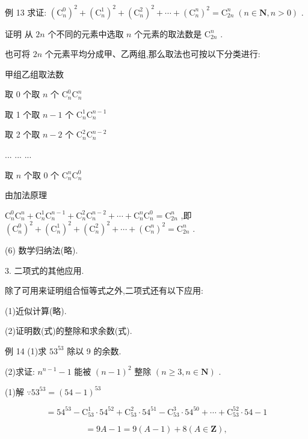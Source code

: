 \documentclass[10pt]{article}
\begin{document}
例 13 求证: \({\left( {\mathrm{C}}_{n}^{0}\right) }^{2} + {\left( {\mathrm{C}}_{n}^{1}\right) }^{2} + {\left( {\mathrm{C}}_{n}^{2}\right) }^{2} + \cdots  + {\left( {\mathrm{C}}_{n}^{n}\right) }^{2} = {\mathrm{C}}_{2n}^{n}\;\left( {n \in  \mathbf{N},n > 0}\right)\) .

证明 从 \({2n}\) 个不同的元素中选取 \(n\) 个元素的取法数是 \({\mathrm{C}}_{2n}^{n}\) .

也可将 \({2n}\) 个元素平均分成甲、乙两组,那么取法也可按以下分类进行:

甲组乙组取法数

取 0 个取 \(n\) 个 \({\mathrm{C}}_{n}^{0}{\mathrm{C}}_{n}^{n}\)

取 1 个取 \(n - 1\) 个 \({\mathrm{C}}_{n}^{1}{\mathrm{C}}_{n}^{n - 1}\)

取 2 个取 \(n - 2\) 个 \({\mathrm{C}}_{n}^{2}{\mathrm{C}}_{n}^{n - 2}\)

... ... ...

取 \(n\) 个取 0 个 \({\mathrm{C}}_{n}^{n}{\mathrm{C}}_{n}^{0}\)

由加法原理

\({\mathrm{C}}_{n}^{0}{\mathrm{C}}_{n}^{n} + {\mathrm{C}}_{n}^{1}{\mathrm{C}}_{n}^{n - 1} + {\mathrm{C}}_{n}^{2}{\mathrm{C}}_{n}^{n - 2} + \cdots  + {\mathrm{C}}_{n}^{n}{\mathrm{C}}_{n}^{0} = {\mathrm{C}}_{2n}^{n}\) ,即 \({\left( {\mathrm{C}}_{n}^{0}\right) }^{2} + {\left( {\mathrm{C}}_{n}^{1}\right) }^{2} + {\left( {\mathrm{C}}_{n}^{2}\right) }^{2} + \cdots  + {\left( {\mathrm{C}}_{n}^{n}\right) }^{2} = {\mathrm{C}}_{2n}^{n}\) .

(6) 数学归纳法(略).

3. 二项式的其他应用.

除了可用来证明组合恒等式之外,二项式还有以下应用:

(1)近似计算(略).

(2)证明数(式)的整除和求余数(式).

例 14 (1)求 \({53}^{53}\) 除以 9 的余数.

(2)求证: \({n}^{n - 1} - 1\) 能被 \({\left( n - 1\right) }^{2}\) 整除 \(\left( {n \geq  3,n \in  \mathbf{N}}\right)\) .

(1)解 \(\because {53}^{53} = {\left( {54} - 1\right) }^{53}\)

\[
= {54}^{53} - {\mathrm{C}}_{53}^{1} \cdot  {54}^{52} + {\mathrm{C}}_{53}^{2} \cdot  {54}^{51} - {\mathrm{C}}_{53}^{3} \cdot  {54}^{50} + \cdots  + {\mathrm{C}}_{53}^{52} \cdot  {54} - 1
\]

\[
= {9A} - 1 = 9\left( {A - 1}\right)  + 8\left( {A \in  \mathbf{Z}}\right) ,
\]
\end{document}
